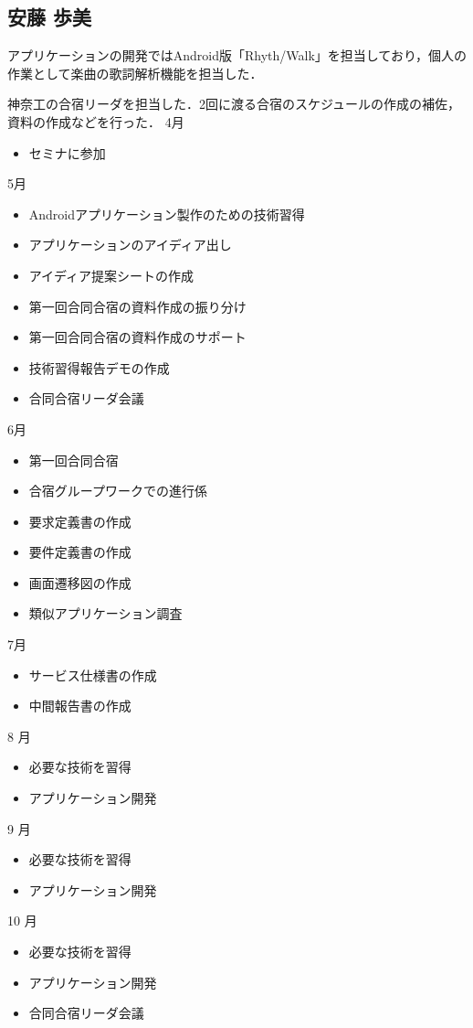 \subsection{安藤 歩美}
\par アプリケーションの開発ではAndroid版「Rhyth/Walk」を担当しており，個人の作業として楽曲の歌詞解析機能を担当した．
\par 神奈工の合宿リーダを担当した．2回に渡る合宿のスケジュールの作成の補佐，資料の作成などを行った．
4月
\begin{itemize}
\item セミナに参加
\end{itemize}
5月
\begin{itemize}
\item Androidアプリケーション製作のための技術習得
\item アプリケーションのアイディア出し
\item アイディア提案シートの作成
\item 第一回合同合宿の資料作成の振り分け
\item 第一回合同合宿の資料作成のサポート
\item 技術習得報告デモの作成
\item 合同合宿リーダ会議
\end{itemize}
6月
\begin{itemize}
\item 第一回合同合宿
\item 合宿グループワークでの進行係
\item 要求定義書の作成
\item 要件定義書の作成
\item 画面遷移図の作成
\item 類似アプリケーション調査
\end{itemize}
7月
\begin{itemize}
\item サービス仕様書の作成
\item 中間報告書の作成
\end{itemize}
8 月
\begin{itemize}
\item 必要な技術を習得
\item アプリケーション開発
\end{itemize}
9 月
\begin{itemize}
\item 必要な技術を習得
\item アプリケーション開発
\end{itemize}
10 月
\begin{itemize}
\item 必要な技術を習得
\item アプリケーション開発
\item 合同合宿リーダ会議
\end{itemize}
